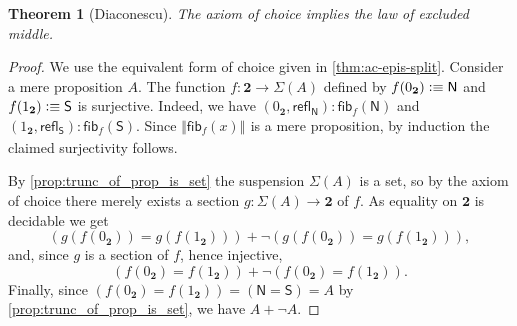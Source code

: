 \documentclass[10pt,a4paper]{article}
\providecommand{\index}[1]{}
\newcommand{\defeq}{\vcentcolon\equiv}  %
\newcommand{\pairr}[1]{{\mathopen{}(#1)\mathclose{}}}
\newcommand{\refl}[1]{\ensuremath{\mathsf{refl}_{#1}}\xspace}
\newcommand{\hfib}[2]{{\mathsf{fib}}_{#1}(#2)}
\let\hfiber\hfib
\newcommand{\ttrunc}[2]{\bigl\Vert #2\bigr\Vert_{#1}}
\newcommand{\bbrck}[1]{\ttrunc{}{#1}}
\newcommand{\bool}{\ensuremath{\mathbf{2}}\xspace}
\newcommand{\btrue}{{1_{\bool}}}
\newcommand{\bfalse}{{0_{\bool}}}
\newcommand{\susp}{\Sigma}
\newcommand{\north}{\mathsf{N}}
\newcommand{\south}{\mathsf{S}}
\newtheorem{thm}{Theorem}[section]
\theoremstyle{definition}
\theoremstyle{remark}
\numberwithin{equation}{section}
\begin{document}
\begin{thm}[Diaconescu]\label{thm:1surj_to_surj_to_pem}
  \index{axiom!of choice}%
  \index{excluded middle}%
  \index{Diaconescu's theorem}\index{theorem!Diaconescu's}%
  The axiom of choice implies the law of excluded middle.
\end{thm}

\begin{proof}
We use the equivalent form of choice given in \cref{thm:ac-epis-split}.
Consider a mere proposition $A$.
The function $f:\bool\to\susp(A)$ defined by
$f(\bfalse) \defeq \north$ and $f(\btrue) \defeq \south$
is surjective.
Indeed, we have
$\pairr{\bfalse,\refl{\north}} : \hfiber{f}{\north}$
and $\pairr{\btrue,\refl{\south}} :\hfiber{f}{\south}$.
Since $\bbrck{\hfiber{f}{x}}$ is a mere proposition, by induction the claimed surjectivity follows.

By \cref{prop:trunc_of_prop_is_set} the suspension $\susp(A)$
is a set, so by the axiom of choice there merely exists a
section $g: \susp(A) \to \bool$ of $f$.
As equality on $\bool$ is decidable we get
\begin{equation*}
 (g(f(\bfalse))= g(f(\btrue))) +
 \lnot (g(f(\bfalse))= g(f(\btrue))),
\end{equation*}
and, since $g$ is a section of $f$, hence injective,
\begin{equation*}
(f(\bfalse) = f(\btrue)) +
\lnot (f(\bfalse) = f(\btrue)).
\end{equation*}
Finally, since $(f(\bfalse)=f(\btrue)) = (\north=\south) = A$ by \cref{prop:trunc_of_prop_is_set}, we have $A+\neg A$.
\end{proof}



\end{document}
